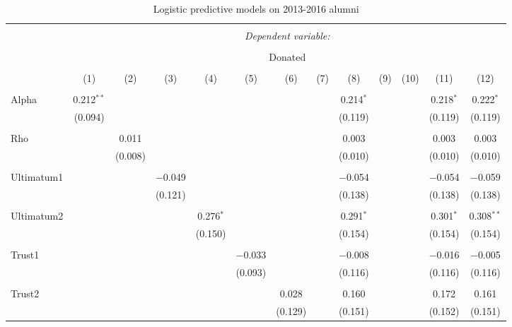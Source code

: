 \begin{table}[H] \centering 
  \caption{Logistic predictive models on 2013-2016 alumni} 
  \label{} 
  \begin{adjustbox}{width=\textwidth}
\begin{tabular}{@{\extracolsep{5pt}}lcccccccccccc} 
\\[-1.8ex]\hline 
\hline \\[-1.8ex] 
 & \multicolumn{12}{c}{\textit{Dependent variable:}} \\ 
\cline{2-13} 
\\[-1.8ex] & \multicolumn{12}{c}{Donated} \\ 
\\[-1.8ex] & (1) & (2) & (3) & (4) & (5) & (6) & (7) & (8) & (9) & (10) & (11) & (12)\\ 
\hline \\[-1.8ex] 
 Alpha & 0.212$^{**}$ &  &  &  &  &  &  & 0.214$^{*}$ &  &  & 0.218$^{*}$ & 0.222$^{*}$ \\ 
  & (0.094) &  &  &  &  &  &  & (0.119) &  &  & (0.119) & (0.119) \\ 
  & & & & & & & & & & & & \\ 
 Rho &  & 0.011 &  &  &  &  &  & 0.003 &  &  & 0.003 & 0.003 \\ 
  &  & (0.008) &  &  &  &  &  & (0.010) &  &  & (0.010) & (0.010) \\ 
  & & & & & & & & & & & & \\ 
 Ultimatum1 &  &  & $-$0.049 &  &  &  &  & $-$0.054 &  &  & $-$0.054 & $-$0.059 \\ 
  &  &  & (0.121) &  &  &  &  & (0.138) &  &  & (0.138) & (0.138) \\ 
  & & & & & & & & & & & & \\ 
 Ultimatum2 &  &  &  & 0.276$^{*}$ &  &  &  & 0.291$^{*}$ &  &  & 0.301$^{*}$ & 0.308$^{**}$ \\ 
  &  &  &  & (0.150) &  &  &  & (0.154) &  &  & (0.154) & (0.154) \\ 
  & & & & & & & & & & & & \\ 
 Trust1 &  &  &  &  & $-$0.033 &  &  & $-$0.008 &  &  & $-$0.016 & $-$0.005 \\ 
  &  &  &  &  & (0.093) &  &  & (0.116) &  &  & (0.116) & (0.116) \\ 
  & & & & & & & & & & & & \\ 
 Trust2 &  &  &  &  &  & 0.028 &  & 0.160 &  &  & 0.172 & 0.161 \\ 
  &  &  &  &  &  & (0.129) &  & (0.151) &  &  & (0.152) & (0.151) \\ 

\end{tabular}
\end{adjustbox}
\end{table}
